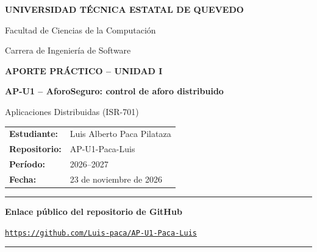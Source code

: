 \documentclass[12pt,a4paper]{article}
\begin{document}
\begin{center}
{\large\bfseries UNIVERSIDAD TÉCNICA ESTATAL DE QUEVEDO}\par
{\normalsize Facultad de Ciencias de la Computación}\par
{\normalsize Carrera de Ingeniería de Software}\par
\vspace{1cm}
{\Large\bfseries APORTE PRÁCTICO -- UNIDAD I}\par
\vspace{0.3cm}
{\large\bfseries AP-U1 -- AforoSeguro: control de aforo distribuido}\par
\vspace{0.2cm}
{\normalsize Aplicaciones Distribuidas (ISR-701)}\par
\end{center}
\vspace{1cm}
\begin{tabular}{@{}>{\bfseries}p{4.0cm}p{10.0cm}@{}}
Estudiante: & Luis Alberto Paca Pilataza \\[0.45cm]
Repositorio: & AP-U1-Paca-Luis \\[0.45cm]
Período: & 2026--2027 \\[0.45cm]
Fecha: & 23 de noviembre de 2026 \\
\end{tabular}
\vspace{0.9cm}
\hrule
\vspace{0.5cm}
\textbf{Enlace público del repositorio de GitHub}\par
\vspace{0.25cm}
\begin{center}
{\fontsize{10}{12}\selectfont\mbox{\href{https://github.com/Luis-paca/AP-U1-Paca-Luis}{\texttt{https://github.com/Luis-paca/AP-U1-Paca-Luis}}}}\par
\end{center}
\vspace{0.4cm}
\hrule
\vfill
\end{document}

